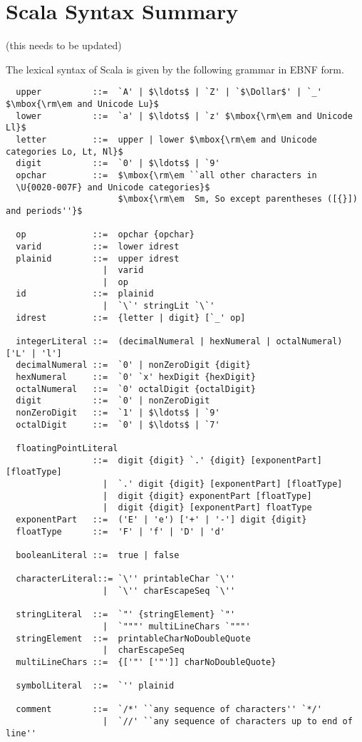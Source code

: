 \appendix
\chapter{Scala Syntax Summary}

(this needs to be updated)

The lexical syntax of Scala is given by the following grammar in EBNF
form.

\begin{lstlisting}
  upper          ::=  `A' | $\ldots$ | `Z' | `$\Dollar$' | `_' $\mbox{\rm\em and Unicode Lu}$
  lower          ::=  `a' | $\ldots$ | `z' $\mbox{\rm\em and Unicode Ll}$
  letter         ::=  upper | lower $\mbox{\rm\em and Unicode categories Lo, Lt, Nl}$
  digit          ::=  `0' | $\ldots$ | `9'
  opchar         ::=  $\mbox{\rm\em ``all other characters in
  \U{0020-007F} and Unicode categories}$
                      $\mbox{\rm\em  Sm, So except parentheses ([{}]) and periods''}$

  op             ::=  opchar {opchar} 
  varid          ::=  lower idrest
  plainid        ::=  upper idrest
                   |  varid
                   |  op
  id             ::=  plainid
                   |  `\`' stringLit `\`'
  idrest         ::=  {letter | digit} [`_' op]

  integerLiteral ::=  (decimalNumeral | hexNumeral | octalNumeral) ['L' | 'l']
  decimalNumeral ::=  `0' | nonZeroDigit {digit}
  hexNumeral     ::=  `0' `x' hexDigit {hexDigit}
  octalNumeral   ::=  `0' octalDigit {octalDigit}
  digit          ::=  `0' | nonZeroDigit
  nonZeroDigit   ::=  `1' | $\ldots$ | `9'
  octalDigit     ::=  `0' | $\ldots$ | `7'

  floatingPointLiteral 
                 ::=  digit {digit} `.' {digit} [exponentPart] [floatType]
                   |  `.' digit {digit} [exponentPart] [floatType]
                   |  digit {digit} exponentPart [floatType]
                   |  digit {digit} [exponentPart] floatType
  exponentPart   ::=  ('E' | 'e') ['+' | '-'] digit {digit}
  floatType      ::=  'F' | 'f' | 'D' | 'd'

  booleanLiteral ::=  true | false

  characterLiteral::= `\'' printableChar `\''
                   |  `\'' charEscapeSeq `\''

  stringLiteral  ::=  `"' {stringElement} `"'
                   |  `"""' multiLineChars `"""'
  stringElement  ::=  printableCharNoDoubleQuote 
                   |  charEscapeSeq
  multiLineChars ::=  {['"' ['"']] charNoDoubleQuote}

  symbolLiteral  ::=  `'' plainid

  comment        ::=  `/*' ``any sequence of characters'' `*/'
                   |  `//' ``any sequence of characters up to end of line''
\end{lstlisting}

